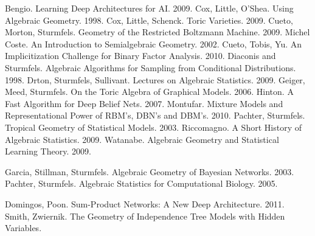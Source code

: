 \documentclass[11pt]{article}
\begin{document}
\begin{thebibliography}{100}
     Bengio.  Learning Deep Architectures for AI. 2009.
     Cox, Little, O'Shea.  Using Algebraic Geometry.  1998.
     Cox, Little, Schenck.  Toric Varieties.  2009.
     Cueto, Morton, Sturmfels. Geometry of the Restricted Boltzmann Machine.  2009.
     Michel Coste.  An Introduction to Semialgebraic Geometry.  2002.
     Cueto, Tobis, Yu.  An Implicitization Challenge for Binary Factor Analysis. 2010.
     Diaconis and Sturmfels.  Algebraic Algorithms for Sampling
    from Conditional Distributions. 1998.
     Drton, Sturmfels, Sullivant. Lectures on Algebraic
    Statistics. 2009.
     Geiger, Meed, Sturmfels.  On the Toric Algebra of Graphical Models. 2006.
     Hinton.  A Fast Algorithm for Deep Belief Nets.  2007.
     Montufar.  Mixture Models and Representational Power of
    RBM's, DBN's and DBM's.  2010.
     Pachter, Sturmfels.  Tropical Geometry of Statistical Models. 2003.
     Riccomagno.  A Short History of Algebraic Statistics.  2009.
     Watanabe.  Algebraic Geometry and Statistical Learning Theory.  2009.

     Garcia, Stillman, Sturmfels.  Algebraic Geometry of Bayesian Networks.  2003.
     Pachter, Sturmfels.  Algebraic Statistics for Computational Biology.  2005.

     Domingos, Poon. Sum-Product Networks: A New Deep Architecture. 2011.
     Smith, Zwiernik.  The Geometry of Independence Tree Models with Hidden Variables.
\end{thebibliography}
\end{document}
